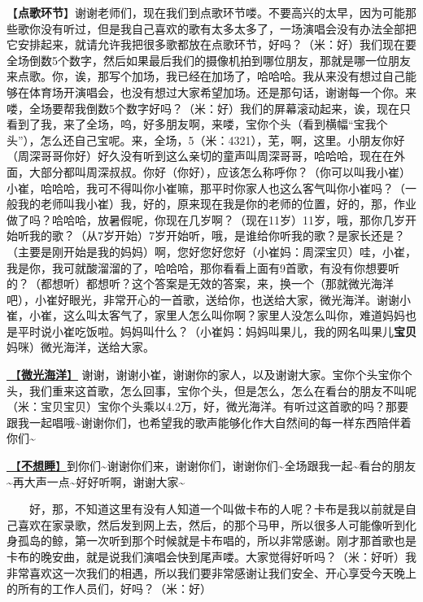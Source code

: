 \documentclass[]{ctexbook}
\begin{document}
【\textbf{点歌环节}】谢谢老师们，现在我们到点歌环节喽。不要高兴的太早，因为可能那些歌你没有听过，但是我自己喜欢的歌有太多太多了，一场演唱会没有办法全部把它安排起来，就请允许我把很多歌都放在点歌环节，好吗？（米：好）我们现在要全场倒数5个数字，然后如果最后我们的摄像机拍到哪位朋友，那就是哪一位朋友来点歌。你，诶，那写个加场，我已经在加场了，哈哈哈。我从来没有想过自己能够在体育场开演唱会，也没有想过大家希望加场。还是那句话，谢谢每一个你。来喽，全场要帮我倒数5个数字好吗？（米：好）我们的屏幕滚动起来，诶，现在只看到了我，来了全场，呜，好多朋友啊，来喽，宝你个头（看到横幅``宝我个头''），怎么还自己宝呢。来，全场，5（米：4321），芜，啊，这里。小朋友你好（周深哥哥你好）好久没有听到这么亲切的童声叫周深哥哥，哈哈哈，现在在外面，大部分都叫周深叔叔。你好（你好），应该怎么称呼你？（你可以叫我小崔）小崔，哈哈哈，我可不得叫你小崔嘛，那平时你家人也这么客气叫你小崔吗？（一般我的老师叫我小崔）我，好的，原来现在我是你的老师的位置，好的，那，作业做了吗？哈哈哈，放暑假呢，你现在几岁啊？（现在11岁）11岁，哦，那你几岁开始听我的歌？（从7岁开始）7岁开始听，哦，是谁给你听我的歌？是家长还是？（主要是刚开始是我的妈妈）啊，您好您好您好（小崔妈：周深宝贝）哇，小崔，我是你，我可就酸溜溜的了，哈哈哈，那你看看上面有9首歌，有没有你想要听的？（都想听）都想听？这个答案是无效的答案，来，换一个（那就微光海洋吧），小崔好眼光，非常开心的一首歌，送给你，也送给大家，微光海洋。谢谢小崔，小崔，这么叫太客气了，家里人怎么叫你啊？家里人没怎么叫你，难道妈妈也是平时说小崔吃饭啦。妈妈叫什么？（小崔妈：妈妈叫果儿，我的网名叫果儿\textbf{宝贝}妈咪）微光海洋，送给大家。

\hyperref[sea-of-shimmer]{🎵【\textbf{微光海洋}】} 谢谢，谢谢小崔，谢谢你的家人，以及谢谢大家。宝你个头宝你个头，我们重来这首歌，怎么回事，宝你个头，但是怎么，怎么在看台的朋友不叫呢（米：宝贝宝贝）宝你个头乘以4.2万，好，微光海洋。有听过这首歌的吗？那要跟我一起唱哦\textasciitilde 谢谢你们，也希望我的歌声能够化作大自然间的每一样东西陪伴着你们\textasciitilde{}

\hyperref[donot-want-to-sleep]{🎵【\textbf{不想睡}】}到你们\textasciitilde 谢谢你们来，谢谢你们，谢谢你们\textasciitilde 全场跟我一起\textasciitilde 看台的朋友\textasciitilde 再大声一点\textasciitilde 好好听啊，谢谢大家\textasciitilde{}

  好，那，不知道这里有没有人知道一个叫做卡布的人呢？卡布是我以前就是自己喜欢在家录歌，然后发到网上去，然后，的那个马甲，所以很多人可能像听到化身孤岛的鲸，第一次听到那个时候就是卡布唱的，所以非常感谢。刚才那首歌也是卡布的晚安曲，就是说我们演唱会快到尾声喽。大家觉得好听吗？（米：好听）我非常喜欢这一次我们的相遇，所以我们要非常感谢让我们安全、开心享受今天晚上的所有的工作人员们，好吗？（米：好）
\end{document}
